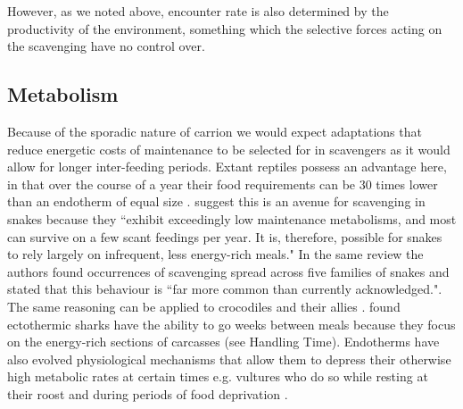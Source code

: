\documentclass[a4paper,12pt]{article}
\begin{document}
However, as we noted above, encounter rate is also determined by the productivity of the environment, something which the selective forces acting on the scavenging have no control over. 


\subsection*{Metabolism}
Because of the sporadic nature of carrion we would expect adaptations that reduce energetic costs of maintenance to be selected for in scavengers as it would allow for longer inter-feeding periods. 
Extant reptiles possess an advantage here, in that over the course of a year their food requirements can be 30 times lower than an endotherm of equal size \citep{Nagy1621}.
\cite{devault2002scavenging} suggest this is an avenue for scavenging in snakes because they ``exhibit exceedingly low maintenance metabolisms, and most can survive on a few scant feedings per year.
It is, therefore, possible for snakes to rely largely on infrequent, less energy-rich meals."
In the same review the authors found occurrences of scavenging spread across five families of snakes and stated that this behaviour is ``far more common than currently acknowledged."\citep{devault2002scavenging}.
The same reasoning can be applied to crocodiles and their allies \citep{forrest2003evidence,moleon2015carcass}. 
\cite{carey1982temperature} found ectothermic sharks have the ability to go weeks between meals because they focus on the energy-rich sections of carcasses (see Handling Time). 
Endotherms have also evolved physiological mechanisms that allow them to depress their otherwise high metabolic rates at certain times e.g. vultures who do so while resting at their roost and during periods of food deprivation \citep{bahat1998nocturnal}. 
\end{document}
